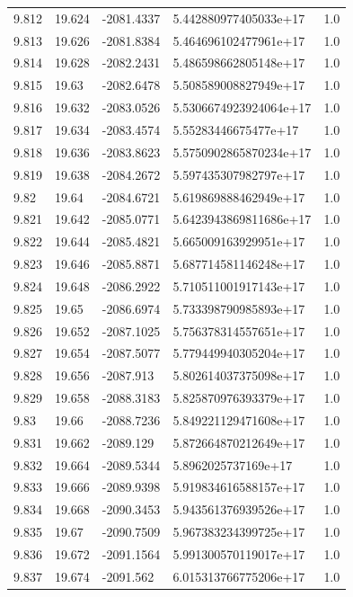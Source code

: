 \begin{tabular}{lllll}
9.812 & 19.624 & -2081.4337 & 5.442880977405033e+17 & 1.0 \\
9.813 & 19.626 & -2081.8384 & 5.464696102477961e+17 & 1.0 \\
9.814 & 19.628 & -2082.2431 & 5.486598662805148e+17 & 1.0 \\
9.815 & 19.63 & -2082.6478 & 5.508589008827949e+17 & 1.0 \\
9.816 & 19.632 & -2083.0526 & 5.5306674923924064e+17 & 1.0 \\
9.817 & 19.634 & -2083.4574 & 5.55283446675477e+17 & 1.0 \\
9.818 & 19.636 & -2083.8623 & 5.5750902865870234e+17 & 1.0 \\
9.819 & 19.638 & -2084.2672 & 5.597435307982797e+17 & 1.0 \\
9.82 & 19.64 & -2084.6721 & 5.619869888462949e+17 & 1.0 \\
9.821 & 19.642 & -2085.0771 & 5.6423943869811686e+17 & 1.0 \\
9.822 & 19.644 & -2085.4821 & 5.665009163929951e+17 & 1.0 \\
9.823 & 19.646 & -2085.8871 & 5.687714581146248e+17 & 1.0 \\
9.824 & 19.648 & -2086.2922 & 5.710511001917143e+17 & 1.0 \\
9.825 & 19.65 & -2086.6974 & 5.733398790985893e+17 & 1.0 \\
9.826 & 19.652 & -2087.1025 & 5.756378314557651e+17 & 1.0 \\
9.827 & 19.654 & -2087.5077 & 5.779449940305204e+17 & 1.0 \\
9.828 & 19.656 & -2087.913 & 5.802614037375098e+17 & 1.0 \\
9.829 & 19.658 & -2088.3183 & 5.825870976393379e+17 & 1.0 \\
9.83 & 19.66 & -2088.7236 & 5.849221129471608e+17 & 1.0 \\
9.831 & 19.662 & -2089.129 & 5.872664870212649e+17 & 1.0 \\
9.832 & 19.664 & -2089.5344 & 5.8962025737169e+17 & 1.0 \\
9.833 & 19.666 & -2089.9398 & 5.919834616588157e+17 & 1.0 \\
9.834 & 19.668 & -2090.3453 & 5.943561376939526e+17 & 1.0 \\
9.835 & 19.67 & -2090.7509 & 5.967383234399725e+17 & 1.0 \\
9.836 & 19.672 & -2091.1564 & 5.991300570119017e+17 & 1.0 \\
9.837 & 19.674 & -2091.562 & 6.015313766775206e+17 & 1.0 \\

\end{tabular}

